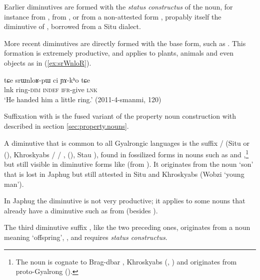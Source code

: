 Earlier diminutives are formed with the\textit{ status constructus} of the noun, for instance  from ,  from , or  from a non-attested form , propably itself the  diminutive of , borrowed from a Situ dialect.

More recent diminutives are directly formed with the base form, such as . This formation is extremely productive, and applies to plants, animals and even objects as in (\ref{ex:srWnloR}).

\begin{exe}
\ex \label{ex:srWnloR}
\gll tɕe srɯnloʁ-pɯ ci ɲɤ-kʰo tɕe \\
lnk ring-\textsc{dim} \textsc{indef} \textsc{ifr}-give \textsc{lnk} \\
\glt `He handed him a little ring.' (2011-4-smanmi, 120)
\end{exe}

Suffixation with  is the fused variant of the property noun construction with  described in section \ref{sec:property.nouns}.

A diminutive that is common to all Gyalrongic languages is the suffix / (Situ  or  (\citealt[163]{linxr93jiarongen}), Khroskyabs  /  / ,  (\citealt[158]{lai17khroskyabs}), Stau ), found in fossilized forms in nouns such as  and ,\footnote{The noun  is cognate to Brag-dbar , Khroskyabs  (\citealt{zhang16bragdbar}, \citealt[156]{lai17khroskyabs}) and originates from proto-Gyalrong  (\citealt[53]{jacques08zh}). } but still visible in diminutive forms like  (from ). It originates from the noun `son' that is lost in Japhug but still attested in Situ and Khroskyabs (Wobzi  `young man'). 

In Japhug the  diminutive is not very productive; it applies to some nouns that already have a  diminutive such as  from  (besides ).

The third diminutive suffix , like the two preceding ones, originates from a noun meaning `offspring', , and requires \textit{status constructus}.

